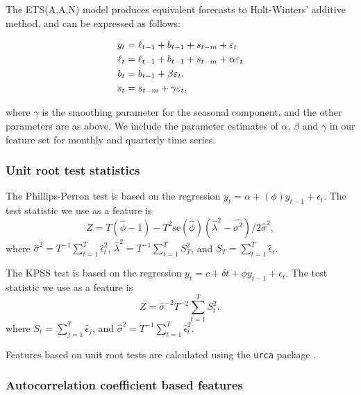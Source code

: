 \documentclass[11pt,a4paper,]{article}
\theoremstyle{definition}
\theoremstyle{definition}
\theoremstyle{definition}
\theoremstyle{remark}
\begin{document}
The ETS(A,A,N) model \autocite{expsmooth08} produces equivalent
forecasts to Holt-Winters' additive method, and can be expressed as
follows:\vspace*{-.9cm}

\begin{align*}
  y_t    & = \ell_{t-1}+b_{t-1}+s_{t-m}+\varepsilon_t\\
  \ell_t & = \ell_{t-1}+b_{t-1}+s_{t-m}+\alpha \varepsilon_t\\
  b_t    & = b_{t-1}+\beta \varepsilon_t,\\
  s_t &= s_{t-m} + \gamma\varepsilon_t,\vspace*{-0.99cm}
\end{align*}

where \(\gamma\) is the smoothing parameter for the seasonal component,
and the other parameters are as above. We include the parameter
estimates of \(\alpha\), \(\beta\) and \(\gamma\) in our feature set for
monthly and quarterly time series.

\subsubsection*{Unit root test
statistics}\label{unit-root-test-statistics}

The Phillips-Perron test is based on the regression
\(y_t=\alpha+(\phi)y_{t-1}+ \epsilon_t\). The test statistic we use as a
feature is \[
  Z = T(\hat{\phi}-1)- T^2\text{se}(\hat{\phi})(\hat{\lambda}^2-\hat{\sigma^2})/2\hat\sigma^2,
\] where \(\hat\sigma^2= T^{-1}\sum_{t=1}^{T} \hat\epsilon_t^2\),
\(\hat\lambda^2=T^{-1} \sum_{t=1}^{T} S_T^2\), and
\(S_T = \sum_{t=1}^{T}\hat\epsilon_t\).

The KPSS test is based on the regression
\(y_t=c+\delta t+\phi y_{t-1}+\epsilon_t\). The test statistic we use as
a feature is \[
  Z= \hat{\sigma}^{-2} T^{-2}\sum_{t=1}^{T}S_t^2,
\] where \(S_t=\sum_{j=1}^T\hat{\epsilon}_j\), and
\(\hat{\sigma}^2 = T^{-1}\sum_{t=1}^{T} \hat\epsilon_t^2\).

Features based on unit root tests are calculated using the \texttt{urca}
package \autocite{pfaff2016package}.

\subsubsection*{Autocorrelation coefficient based
features}\label{autocorrelation-coefficient-based-features}
\end{document}
